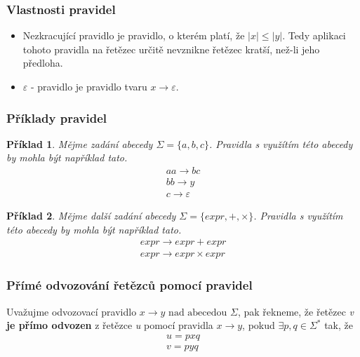 \documentclass[10pt, a4paper, titlepage]{article}
\theoremstyle{note}
\newtheorem{priklad}{\textbf{Příklad}}
\begin{document}
\subsubsection{Vlastnosti pravidel}
\begin{itemize}
\item Nezkracující pravidlo je pravidlo, o kterém platí, že $|x| \leq |y| $. Tedy aplikaci tohoto pravidla na řetězec určitě nevznikne řetězec kratší, než-li jeho předloha.

\item $\varepsilon$ - pravidlo je pravidlo tvaru $x \rightarrow \varepsilon$.
\end{itemize}

\subsubsection{Příklady pravidel}
\begin{priklad}
Mějme zadání abecedy $\Sigma = \lbrace a,b,c \rbrace$. Pravidla s využítím této abecedy by mohla být například tato.
\begin{gather*}
aa \rightarrow bc \\
bb \rightarrow y \\
c \rightarrow \varepsilon
\end{gather*}
\end{priklad}

\begin{priklad}
Mějme další zadání abecedy $\Sigma = \lbrace expr, +, \times \rbrace$. Pravidla s využítím této abecedy by mohla být například tato.
\begin{gather*}
\textit{expr} \rightarrow \textit{expr} + \textit{expr} \\
\textit{expr} \rightarrow \textit{expr} \times \textit{expr}
\end{gather*}
\end{priklad}

\subsubsection{Přímé odvozování řetězců pomocí pravidel}
Uvažujme odvozovací pravidlo $ x \rightarrow y \text{ nad abecedou } \Sigma$, pak řekneme, že řetězec \emph{v} \textbf{je přímo odvozen}
z řetězce \emph{u} pomocí pravidla $ x \rightarrow y $, pokud $\exists p, q \in \Sigma^{*}$ tak, že
\begin{gather*}
u = p x q \\
v = p y q
\end{gather*}
\end{document}
